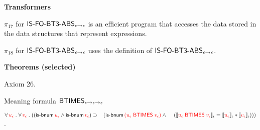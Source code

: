 \begin{biformthy}
  \ee

  \item[] \textbf{Transformers}

  \be

    \setcounter{enumi}{16}

    \item $\pi_{17}$ for $\mbox{\sf IS-FO-BT3-ABS}_{\epsilon \rightarrow
      \epsilon}$ is an efficient program that accesses the data stored
      in the data structures that represent expressions.

    \item $\pi_{18}$ for $\mbox{\sf IS-FO-BT3-ABS}_{\epsilon \rightarrow
      \epsilon}$ uses the definition of
      $\mbox{\sf IS-FO-BT3-ABS}_{\epsilon \rightarrow \epsilon}$.

  \ee

  \item[] \textbf{Theorems (selected)}

  \be

    \setcounter{enumi}{3}

    \item Axiom 26.

    \item Meaning formula
    $\mbox{\sf BTIMES}_{\epsilon \rightarrow \epsilon \rightarrow \epsilon}$

    $\forall\, \textcolor{red}{u_\epsilon} \mathrel. \forall\, \textcolor{red}{v_\epsilon} \mathrel.
    ((\mbox{\sf is-bnum} \, \textcolor{red}{u_\epsilon} \wedge \mbox{\sf is-bnum} \, \textcolor{red}{v_\epsilon}) 
    \supset {}\\
    \hspace*{2ex}(\mbox{\sf is-bnum} \, 
    \textcolor{red}{(u_\epsilon \; \mbox{\sf BTIMES} \; v_\epsilon)} \wedge {}\\
    \hspace*{2.8ex}(\llbracket\textcolor{red}{u_\epsilon \; \mbox{\sf BTIMES} \; 
    v_\epsilon}\rrbracket_\iota = 
    \llbracket\textcolor{red}{u_\epsilon}\rrbracket_\iota * \llbracket\textcolor{red}{v_\epsilon}\rrbracket_\iota)))$.

  \ee

\ei
\end{biformthy}

